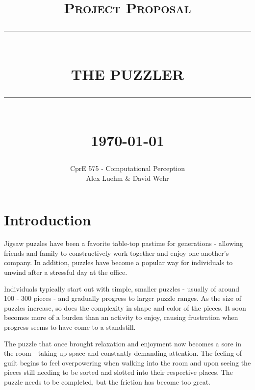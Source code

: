 \documentclass[12pt]{report}
\newcommand{\HRule}[1]{\rule{\linewidth}{#1}}
\begin{document}
\title{ \normalsize \textsc{Project Proposal}
		\\ [2.0cm]
		\HRule{0.5pt} \\
		\LARGE \textbf{\uppercase{The Puzzler}}
		\HRule{2pt} \\ [0.5cm]
		\normalsize \today \vspace*{5\baselineskip}}

\date{}

\author{
		CprE 575 - Computational Perception \\
		Alex Luehm \& David Wehr }

\maketitle
\tableofcontents
\newpage

\sectionfont{\scshape}


\section*{Introduction}
Jigsaw puzzles have been a favorite table-top pastime for generations - allowing friends and family to constructively work together and enjoy one another's company. In addition, puzzles have become a popular way for individuals to unwind after a stressful day at the office. 

Individuals typically start out with simple, smaller puzzles - usually of around 100 - 300 pieces - and gradually progress to larger puzzle ranges. As the size of puzzles increase, so does the complexity in shape and color of the pieces. It soon becomes more of a burden than an activity to enjoy, causing frustration when progress seems to have come to a standstill.

The puzzle that once brought relaxation and enjoyment now becomes a sore in the room - taking up space and constantly demanding attention. The feeling of guilt begins to feel overpowering when walking into the room and upon seeing the pieces still needing to be sorted and slotted into their respective places. The puzzle needs to be completed, but the friction has become too great.
\end{document}
